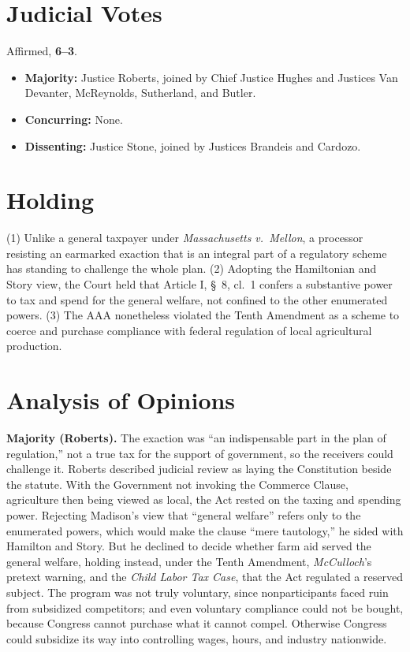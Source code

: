 \documentclass[12pt]{article}
\begin{document}
\section{Judicial Votes}

Affirmed, \textbf{6--3}.
\begin{itemize}
\item \textbf{Majority:} Justice Roberts, joined by Chief Justice Hughes and Justices Van Devanter, McReynolds, Sutherland, and Butler.
\item \textbf{Concurring:} None.
\item \textbf{Dissenting:} Justice Stone, joined by Justices Brandeis and Cardozo.
\end{itemize}

\section{Holding}

(1) Unlike a general taxpayer under \textit{Massachusetts v.\ Mellon}, a processor resisting an earmarked exaction that is an integral part of a regulatory scheme has standing to challenge the whole plan. (2) Adopting the Hamiltonian and Story view, the Court held that Article I, \S~8, cl.~1 confers a substantive power to tax and spend for the general welfare, not confined to the other enumerated powers. (3) The AAA nonetheless violated the Tenth Amendment as a scheme to coerce and purchase compliance with federal regulation of local agricultural production.

\section{Analysis of Opinions}

\textbf{Majority (Roberts).} The exaction was ``an indispensable part in the plan of regulation,'' not a true tax for the support of government, so the receivers could challenge it. Roberts described judicial review as laying the Constitution beside the statute. With the Government not invoking the Commerce Clause, agriculture then being viewed as local, the Act rested on the taxing and spending power. Rejecting Madison's view that ``general welfare'' refers only to the enumerated powers, which would make the clause ``mere tautology,'' he sided with Hamilton and Story. But he declined to decide whether farm aid served the general welfare, holding instead, under the Tenth Amendment, \textit{McCulloch}'s pretext warning, and the \textit{Child Labor Tax Case}, that the Act regulated a reserved subject. The program was not truly voluntary, since nonparticipants faced ruin from subsidized competitors; and even voluntary compliance could not be bought, because Congress cannot purchase what it cannot compel. Otherwise Congress could subsidize its way into controlling wages, hours, and industry nationwide.
\end{document}
